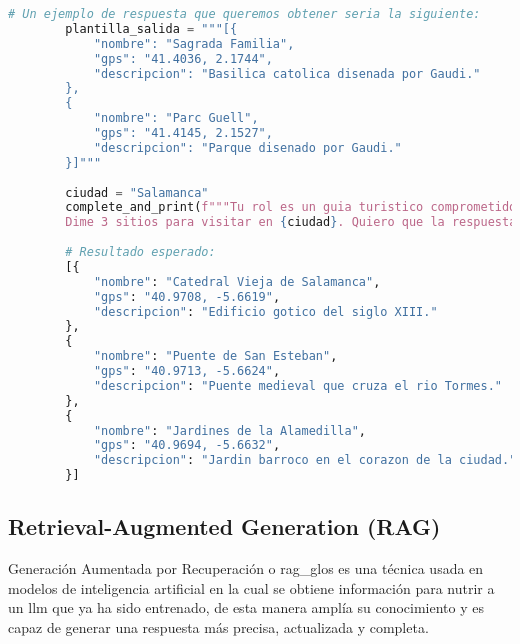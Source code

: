 	\begin{lstlisting}[language=Python, caption={Ejemplo de uso de \textit{few-shot} y \textit{tool-calling} para obtener puntos de interés turísticos}]
		# Un ejemplo de respuesta que queremos obtener seria la siguiente:
		plantilla_salida = """[{
			"nombre": "Sagrada Familia", 
			"gps": "41.4036, 2.1744", 
			"descripcion": "Basilica catolica disenada por Gaudi." 
		},
		{
			"nombre": "Parc Guell", 
			"gps": "41.4145, 2.1527", 
			"descripcion": "Parque disenado por Gaudi."
		}]"""
		
		ciudad = "Salamanca"
		complete_and_print(f"""Tu rol es un guia turistico comprometido con el medio ambiente preocupado por la gentrificacion de las ciudades y el turismo masivo. 
		Dime 3 sitios para visitar en {ciudad}. Quiero que la respuesta consista SOLO en los lugares de interes de este lugar, siguiendo el ejemplo de la {plantilla_salida}. Insisto en que no quiero que me des informacion adicional.""")
		
		# Resultado esperado:
		[{
			"nombre": "Catedral Vieja de Salamanca", 
			"gps": "40.9708, -5.6619", 
			"descripcion": "Edificio gotico del siglo XIII."
		},
		{
			"nombre": "Puente de San Esteban", 
			"gps": "40.9713, -5.6624", 
			"descripcion": "Puente medieval que cruza el rio Tormes."
		},
		{
			"nombre": "Jardines de la Alamedilla", 
			"gps": "40.9694, -5.6632", 
			"descripcion": "Jardin barroco en el corazon de la ciudad."
		}]
	\end{lstlisting}
	
	\subsection{Retrieval-Augmented Generation (RAG)}
	Generación Aumentada por Recuperación o \gls{rag_glos} es una técnica usada en modelos de inteligencia artificial en la cual se obtiene información para nutrir a un \acrlong{llm} que ya ha sido entrenado, de esta manera amplía su conocimiento y es capaz de generar una respuesta más precisa, actualizada y completa.
	
